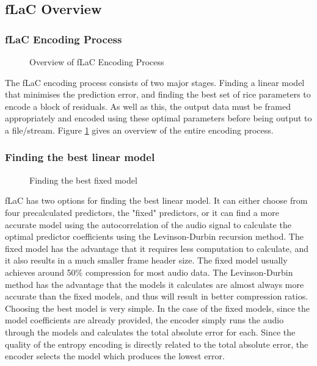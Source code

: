 \documentclass[12pt]{scrartcl}
\begin{document}
  \subsection{fLaC Overview}
  \subsubsection{fLaC Encoding Process}
  \begin{figure}[H]
    \caption{Overview of fLaC Encoding Process}
    \label{fig:encoding_process}
  \end{figure}
  The fLaC encoding process consists of two major stages\cite{flac_format}. Finding a linear model that minimises the prediction error, and finding the best set of rice parameters to encode a block of residuals. As well as this, the output data must be framed appropriately and encoded using these optimal parameters before being output to a file/stream. Figure \ref{fig:encoding_process} gives an overview of the entire encoding process.
  
  \subsubsection*{Finding the best linear model}
  \begin{figure}[H]
    \caption{Finding the best fixed model}
    \label{fig:fixed_optimisation}
  \end{figure}
  fLaC has two options for finding the best linear model. It can either choose from four precalculated predictors, the "fixed" predictors, or it can find a more accurate model using the autocorrelation of the audio signal to calculate the optimal predictor coefficients using the Levinson-Durbin recursion method\cite{levinson_durbin}. The fixed model has the advantage that it requires less computation to calculate, and it also results in a much smaller frame header size. The fixed model usually achieves around 50\% compression for most audio data. The Levinson-Durbin method has the advantage that the models it calculates are almost always more accurate than the fixed models, and thus will result in better compression ratios. Choosing the best model is very simple. In the case of the fixed models, since the model coefficients are already provided, the encoder simply runs the audio through the models and calculates the total absolute error for each. Since the quality of the entropy encoding is directly related to the total absolute error, the encoder selects the model which produces the lowest error. 
  
\end{document}
